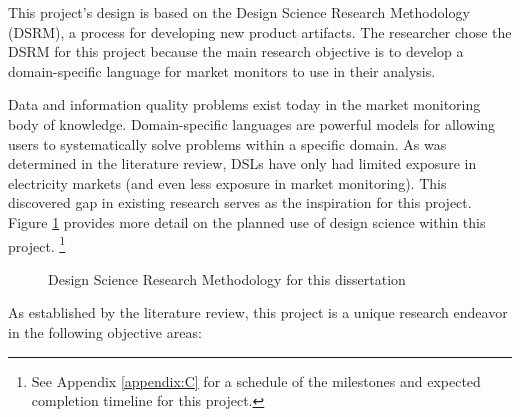 This project's design is based on the Design Science Research Methodology (DSRM), a process for developing new product artifacts. The researcher chose the DSRM for this project because the main research objective is to develop a domain-specific language for market monitors to use in their analysis.

Data and information quality problems exist today in the market monitoring body of knowledge. Domain-specific languages are powerful models for allowing users to systematically solve problems within a specific domain. As was determined in the literature review, DSLs have only had limited exposure in electricity markets (and even less exposure in market monitoring). This discovered gap in existing research serves as the inspiration for this project. Figure \ref{fig:dsrm-diagram} provides more detail on the planned use of design science within this project. \footnote{See Appendix \ref{appendix:C} for a schedule of the milestones and expected completion timeline for this project.}

\begin{figure}[ht]
\centering
{}
\caption{Design Science Research Methodology for this dissertation}
\label{fig:dsrm-diagram}
\end{figure}

As established by the literature review, this project is a unique research endeavor in the following objective areas:

